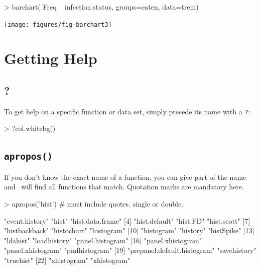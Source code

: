 \begin{Schunk}
\begin{Sinput}
> barchart( Freq ~ infection.status, groups=eaten, data=trem) 
\end{Sinput}
\end{Schunk}

\begin{center}
\texttt{[image: figures/fig-barchart3]}
\end{center}

\vspace{-10mm}
\section{Getting Help}

\subsection{?}

To get help on a specific function or data set, simply precede its name with a \verb!?!:

\begin{Schunk}
\begin{Sinput}
> ?col.whitebg()
\end{Sinput}
\end{Schunk}

\subsection{\texttt{apropos()}}
If you don't know the exact name of a function, you can give part of the name and 
\R\ will find all functions that match.  Quotation marks are mandatory here.

\begin{Schunk}
\begin{Sinput}
> apropos('hist')            # must include quotes.  single or double.
\end{Sinput}
\begin{Soutput}
 [1] "event.history"              "hist"                       "hist.data.frame"           
 [4] "hist.default"               "hist.FD"                    "hist.scott"                
 [7] "histbackback"               "histochart"                 "histogram"                 
[10] "histogram"                  "history"                    "histSpike"                 
[13] "ldahist"                    "loadhistory"                "panel.histogram"           
[16] "panel.xhistogram"           "panel.xhistogram"           "pmfhistogram"              
[19] "prepanel.default.histogram" "savehistory"                "truehist"                  
[22] "xhistogram"                 "xhistogram"                
\end{Soutput}
\end{Schunk}

